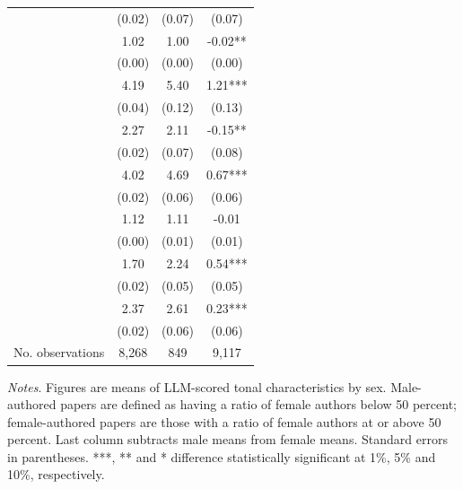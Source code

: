 \begin{table}
\begin{threeparttable}
\begin{tabular}{p{5cm}S@{}S@{}S@{}}
                                          &      (0.02)&      (0.07)&      (0.07)   \\
            &        1.02&        1.00&       -0.02** \\
                                          &      (0.00)&      (0.00)&      (0.00)   \\
            &        4.19&        5.40&        1.21***\\
                                          &      (0.04)&      (0.12)&      (0.13)   \\
            &        2.27&        2.11&       -0.15** \\
                                          &      (0.02)&      (0.07)&      (0.08)   \\
            &        4.02&        4.69&        0.67***\\
                                          &      (0.02)&      (0.06)&      (0.06)   \\
             &        1.12&        1.11&       -0.01   \\
                                          &      (0.00)&      (0.01)&      (0.01)   \\
            &        1.70&        2.24&        0.54***\\
                                          &      (0.02)&      (0.05)&      (0.05)   \\
            &        2.37&        2.61&        0.23***\\
                                          &      (0.02)&      (0.06)&      (0.06)   \\
            \midrule
            No. observations              &       8,268&         849&       9,117   \\
            \bottomrule
        \end{tabular}
        \begin{tablenotes}
            \tiny
            \item \textit{Notes}. Figures are means of LLM-scored tonal characteristics by sex. Male-authored papers are defined as having a ratio of female authors below 50 percent; female-authored papers are those with a ratio of female authors at or above 50 percent. Last column subtracts male means from female means. Standard errors in parentheses. ***, ** and * difference statistically significant at 1\%, 5\% and 10\%, respectively.
        \end{tablenotes}
    \end{threeparttable}
\end{table}